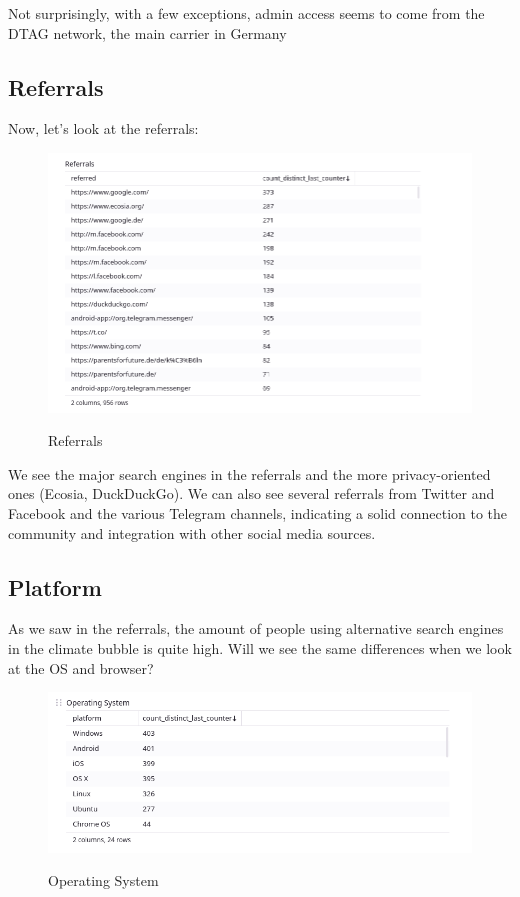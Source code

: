Not surprisingly, with a few exceptions, admin access seems to come from the DTAG network, the main carrier in Germany

\subsection{Referrals}

Now, let's look at the referrals:

\begin{figure}[H]
\centering
\caption {Referrals}
\includegraphics[width=\linewidth]{images/figure07.png}
\label{fig:referrals}
\end{figure}

We see the major search engines in the referrals and the more privacy-oriented ones (Ecosia, DuckDuckGo). We can also see several referrals from Twitter and Facebook and the various Telegram channels, indicating a solid connection to the community and integration with other social media sources.

\subsection{Platform}

As we saw in the referrals, the amount of people using alternative search engines in the climate bubble is quite high. Will we see the same differences when we look at the OS and browser?

\begin{figure}[H]
\centering
\caption {Operating System}
\includegraphics[width=\linewidth]{images/figure08.png}
\label{fig:operatingSystem}
\end{figure}


